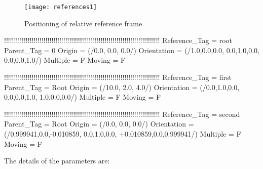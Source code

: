 \begin{figure}
\centering
\texttt{[image: references1]}
\caption{Positioning of relative reference frame}
\label{fig:references1}
\end{figure}

\begin{inputfile}[frame=single, caption={references\_static.in}, label={file:references_static.in}]
!!!!!!!!!!!!!!!!!!!!!!!!!!!!!!!!!!!!!!!!!!!!!!!!!!!!!!!!!!!!!!!!!!!!!!!!!!!!!!!
Reference_Tag = root
Parent_Tag = 0
Origin = (/0.0, 0.0, 0.0/)
Orientation = (/1.0,0.0,0.0, 0.0,1.0,0.0, 0.0,0.0,1.0/)
Multiple = F
Moving = F

!!!!!!!!!!!!!!!!!!!!!!!!!!!!!!!!!!!!!!!!!!!!!!!!!!!!!!!!!!!!!!!!!!!!!!!!!!!!!!!
Reference_Tag = first
Parent_Tag = Root
Origin = (/10.0, 2.0, 4.0/)
Orientation = (/0.0,1.0,0.0, 0.0,0.0,1.0, 1.0,0.0,0.0/)
Multiple = F
Moving = F

!!!!!!!!!!!!!!!!!!!!!!!!!!!!!!!!!!!!!!!!!!!!!!!!!!!!!!!!!!!!!!!!!!!!!!!!!!!!!!!
Reference_Tag = second
Parent_Tag = Root
Origin = (/0.0, 0.0, 0.0/)
Orientation = (/0.999941,0.0,-0.010859, 0.0,1.0,0.0, +0.010859,0.0,0.999941/)
Multiple = F
Moving = F
\end{inputfile}
The details of the parameters are:

